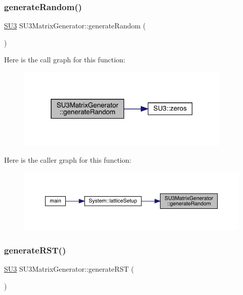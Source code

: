\subsubsection{\texorpdfstring{generateRandom()}{generateRandom()}}
{\footnotesize\ttfamily \mbox{\hyperlink{class_s_u3}{S\+U3}} S\+U3\+Matrix\+Generator\+::generate\+Random (\begin{DoxyParamCaption}{ }\end{DoxyParamCaption})\hspace{0.3cm}{\ttfamily [inline]}}

Here is the call graph for this function\+:\nopagebreak
\begin{figure}[H]
\begin{center}
\leavevmode
\includegraphics[width=289pt]{class_s_u3_matrix_generator_a06dc59b5a86ba6863b848ef1ca26629a_cgraph}
\end{center}
\end{figure}
Here is the caller graph for this function\+:\nopagebreak
\begin{figure}[H]
\begin{center}
\leavevmode
\includegraphics[width=350pt]{class_s_u3_matrix_generator_a06dc59b5a86ba6863b848ef1ca26629a_icgraph}
\end{center}
\end{figure}
\mbox{\label{class_s_u3_matrix_generator_a478a6d34a643f4ee30bc333ca1023b00}} 
\subsubsection{\texorpdfstring{generateRST()}{generateRST()}}
{\footnotesize\ttfamily \mbox{\hyperlink{class_s_u3}{S\+U3}} S\+U3\+Matrix\+Generator\+::generate\+R\+ST (\begin{DoxyParamCaption}{ }\end{DoxyParamCaption})\hspace{0.3cm}{\ttfamily [inline]}}

